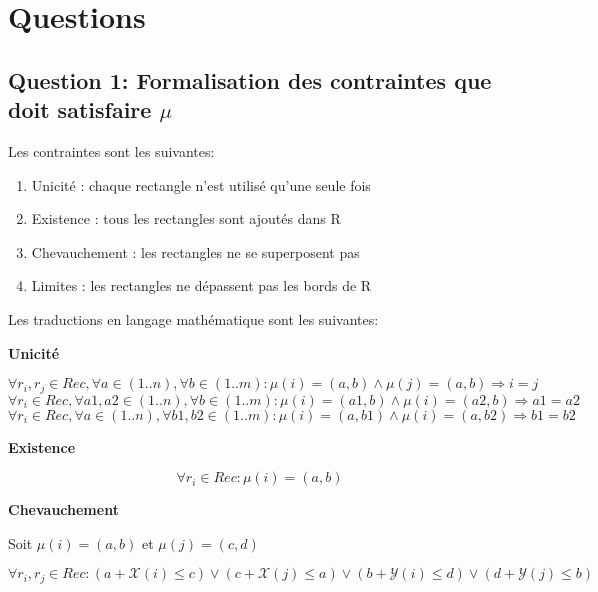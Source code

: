 \documentclass[a4paper,10pt]{article}
\begin{document}
\section{Questions}

\subsection{Question 1: Formalisation des contraintes que doit satisfaire $\mu$}

Les contraintes sont les suivantes:

\begin{enumerate}
\item Unicité : chaque rectangle n'est utilisé qu'une seule fois
\item Existence : tous les rectangles sont ajoutés dans R
\item Chevauchement : les rectangles ne se superposent pas
\item Limites : les rectangles ne dépassent pas les bords de R
\end{enumerate}

Les traductions en langage mathématique sont les suivantes:

\textbf{Unicité}

\begin{equation}
  \label{eq:unicite1}
  \forall r_i, r_j \in Rec, \forall a \in (1..n), \forall b \in (1..m) : \mu(i) = (a, b) \land \mu(j) = (a, b) \Rightarrow i = j
\end{equation}
\begin{equation}
  \label{eq:unicite2}
  \forall r_i \in Rec, \forall a1, a2 \in (1..n), \forall b \in (1..m) : \mu(i) = (a1, b) \land \mu(i) = (a2, b) \Rightarrow a1 = a2
\end{equation}
\begin{equation}
  \label{eq:unicite3}
  \forall r_i \in Rec, \forall a \in (1..n), \forall b1, b2 \in (1..m) : \mu(i) = (a, b1) \land \mu(i) = (a, b2) \Rightarrow b1 = b2
\end{equation}

\textbf{Existence}

\begin{equation}
\label{eq:existence}
\forall r_i \in Rec : \mu(i) = (a,b)
\end{equation}

\textbf{Chevauchement}

Soit $\mu(i) = (a,b)$ et $\mu(j) = (c,d)$

\begin{equation}
\label{eq:chevauchement}
\forall r_i,r_j \in Rec : (a + \mathcal{X}(i) \leq c) \lor (c + \mathcal{X}(j) \leq a) \lor (b + \mathcal{Y}(i) \leq d) \lor (d + \mathcal{Y}(j) \leq b)
\end{equation}
\end{document}
